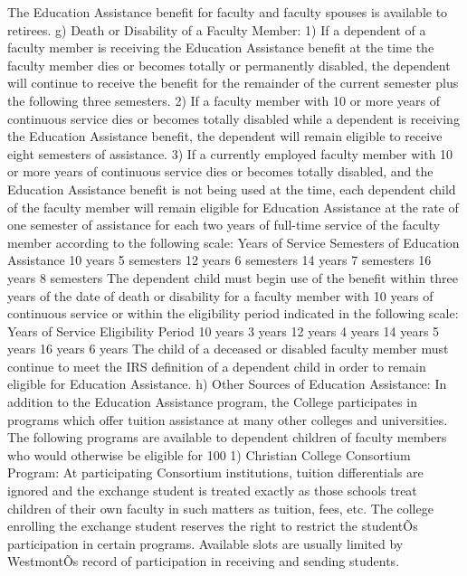 \documentclass[letterpaper, 11pt]{article}
\begin{document}
	The Education Assistance benefit for faculty and faculty spouses is available to retirees.
	g) Death or Disability of a Faculty Member:
	1) If a dependent of a faculty member is receiving the Education Assistance benefit at the time the faculty member dies or becomes totally or permanently disabled, the dependent will continue to receive the benefit for the remainder of the current semester plus the following three semesters.
	2) If a faculty member with 10 or more years of continuous service dies or becomes totally disabled while a dependent is receiving the Education Assistance benefit, the dependent will remain eligible to receive eight semesters of assistance.
	3) If a currently employed faculty member with 10 or more years of continuous service dies or becomes totally disabled, and the Education Assistance benefit is not being used at the time, each dependent child of the faculty member will remain eligible for Education Assistance at the rate of one semester of assistance for each two years of full-time service of the faculty member according to the following scale:
	Years of Service			Semesters of Education Assistance
	10 years				5 semesters
	12 years				6 semesters
	14 years				7 semesters
	16 years				8 semesters
	The dependent child must begin use of the benefit within three years of the date of death or disability for a faculty member with 10 years of continuous service or within the eligibility period indicated in the following scale:
	Years of Service			Eligibility Period
	10 years				3 years
	12 years				4 years
	14 years				5 years
	16 years				6 years
	The child of a deceased or disabled faculty member must continue to meet the IRS definition of a dependent child in order to remain eligible for Education Assistance.
	h) Other Sources of Education Assistance:
	In addition to the Education Assistance program, the College participates in programs which offer tuition assistance at many other colleges and universities.  The following programs are available to dependent children of faculty members who would otherwise be eligible for 100%
	1) Christian College Consortium Program:  At participating Consortium institutions, tuition differentials are ignored and the exchange student is treated exactly as those schools treat children of their own faculty in such matters as tuition, fees, etc.  The college enrolling the exchange student reserves the right to restrict the studentÕs participation in certain programs.  Available slots are usually limited by WestmontÕs record of participation in receiving and sending students.
\end{document}
